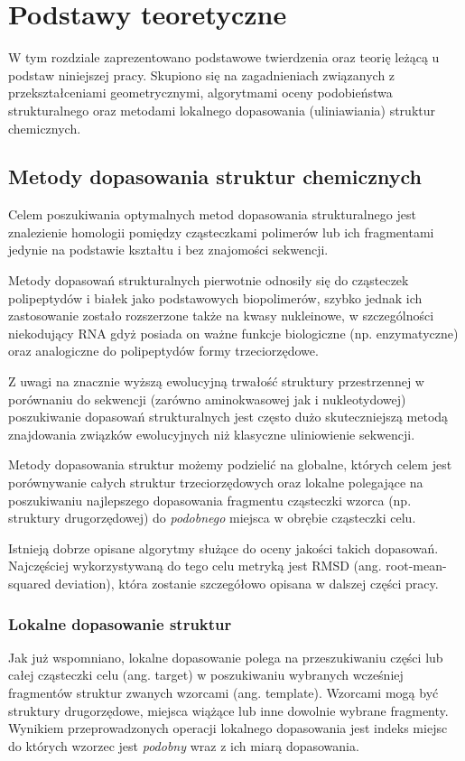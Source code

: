 \documentclass[licencjacka]{pracamgr}
\begin{document}
\chapter{Podstawy teoretyczne}
W tym rozdziale zaprezentowano podstawowe twierdzenia oraz teorię leżącą u podstaw niniejszej pracy. Skupiono się na zagadnieniach związanych z przekształceniami geometrycznymi, algorytmami oceny podobieństwa strukturalnego oraz metodami lokalnego dopasowania (uliniawiania) struktur chemicznych.

\section{Metody dopasowania struktur chemicznych}
Celem poszukiwania optymalnych metod dopasowania strukturalnego jest znalezienie homologii pomiędzy cząsteczkami polimerów lub ich fragmentami jedynie na podstawie kształtu i bez znajomości sekwencji. 

Metody dopasowań strukturalnych pierwotnie odnosiły się do cząsteczek polipeptydów i białek jako podstawowych biopolimerów, szybko jednak ich zastosowanie zostało rozszerzone także na kwasy nukleinowe, w szczególności niekodujący RNA gdyż posiada on ważne funkcje biologiczne (np. enzymatyczne) oraz analogiczne do polipeptydów formy trzeciorzędowe. 

Z uwagi na znacznie wyższą ewolucyjną trwałość struktury przestrzennej w porównaniu do sekwencji (zarówno aminokwasowej jak i nukleotydowej) poszukiwanie dopasowań strukturalnych jest często dużo skuteczniejszą metodą znajdowania związków ewolucyjnych niż klasyczne uliniowienie sekwencji. 

Metody dopasowania struktur możemy podzielić na globalne, których celem jest porównywanie całych struktur trzeciorzędowych oraz lokalne polegające na poszukiwaniu najlepszego dopasowania fragmentu cząsteczki wzorca (np. struktury drugorzędowej) do \textit{podobnego} miejsca w obrębie cząsteczki celu.

Istnieją dobrze opisane algorytmy służące do oceny jakości takich dopasowań. Najczęściej wykorzystywaną do tego celu metryką jest RMSD (ang. root-mean-squared deviation), która zostanie szczegółowo opisana w dalszej części pracy.

\subsection{Lokalne dopasowanie struktur} 
Jak już wspomniano, lokalne dopasowanie polega na przeszukiwaniu części lub całej cząsteczki celu (ang. target) w poszukiwaniu wybranych wcześniej fragmentów struktur zwanych wzorcami (ang. template). Wzorcami mogą być struktury drugorzędowe, miejsca wiążące lub inne dowolnie wybrane fragmenty. Wynikiem przeprowadzonych operacji lokalnego dopasowania jest indeks miejsc do których wzorzec jest \textit{podobny} wraz z ich miarą dopasowania. 
\end{document}
